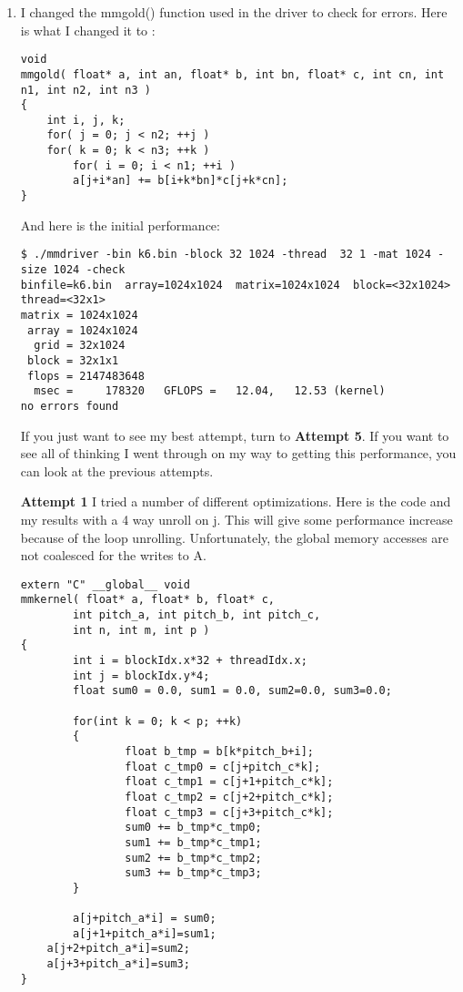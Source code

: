 \documentclass[11pt]{article}
\begin{document}
\begin{enumerate}
\item I changed the mmgold() function used in the driver to check for errors. 
Here is what I changed it to :
\begin{lstlisting}
void
mmgold( float* a, int an, float* b, int bn, float* c, int cn, int n1, int n2, int n3 )
{
    int i, j, k;
    for( j = 0; j < n2; ++j )
	for( k = 0; k < n3; ++k )
	    for( i = 0; i < n1; ++i )
		a[j+i*an] += b[i+k*bn]*c[j+k*cn];
}
\end{lstlisting}

And here is the initial performance:

\begin{lstlisting}
$ ./mmdriver -bin k6.bin -block 32 1024 -thread  32 1 -mat 1024 -size 1024 -check
binfile=k6.bin  array=1024x1024  matrix=1024x1024  block=<32x1024>  thread=<32x1>
matrix = 1024x1024
 array = 1024x1024
  grid = 32x1024
 block = 32x1x1
 flops = 2147483648
  msec =     178320   GFLOPS =   12.04,   12.53 (kernel)
no errors found
\end{lstlisting}

If you just want to see my best attempt, turn to \textbf{Attempt 5}. If you want to see all of thinking I went through on my way to getting this performance, you can look at the previous attempts.

\textbf{Attempt 1}
I tried a number of different optimizations. Here is the code and my results with a 4 way unroll on j. This will give some performance increase because of the loop unrolling. Unfortunately, the global memory accesses are not coalesced for the writes to A.

\begin{lstlisting}
extern "C" __global__ void
mmkernel( float* a, float* b, float* c,
        int pitch_a, int pitch_b, int pitch_c,
        int n, int m, int p )
{
        int i = blockIdx.x*32 + threadIdx.x;
        int j = blockIdx.y*4;
        float sum0 = 0.0, sum1 = 0.0, sum2=0.0, sum3=0.0;

        for(int k = 0; k < p; ++k)
        {
                float b_tmp = b[k*pitch_b+i];
                float c_tmp0 = c[j+pitch_c*k];
                float c_tmp1 = c[j+1+pitch_c*k];
                float c_tmp2 = c[j+2+pitch_c*k];
                float c_tmp3 = c[j+3+pitch_c*k];
                sum0 += b_tmp*c_tmp0;
                sum1 += b_tmp*c_tmp1;
                sum2 += b_tmp*c_tmp2;
                sum3 += b_tmp*c_tmp3;
        }

        a[j+pitch_a*i] = sum0;   
        a[j+1+pitch_a*i]=sum1;
	a[j+2+pitch_a*i]=sum2;
	a[j+3+pitch_a*i]=sum3;
}
\end{lstlisting}


\end{enumerate}
\end{document}
